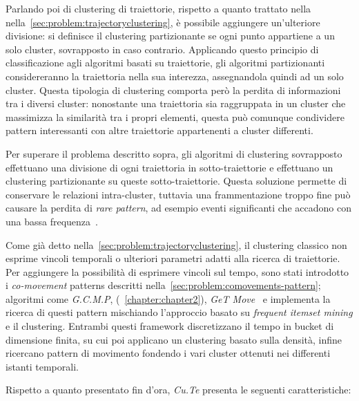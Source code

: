 Parlando poi di clustering di traiettorie, rispetto a quanto trattato nella nella~\cref{sec:problem:trajectoryclustering}, è possibile aggiungere un'ulteriore divisione:
si definisce il clustering partizionante se ogni punto appartiene a un solo cluster, sovrapposto in caso contrario.
Applicando questo principio di classificazione agli algoritmi basati su traiettorie, gli algoritmi partizionanti considereranno la traiettoria nella sua interezza,
assegnandola quindi ad un solo cluster. Questa tipologia di clustering comporta però la perdita di informazioni tra i diversi cluster:
nonostante una traiettoria sia raggruppata in un cluster che massimizza la similarità tra i propri elementi,
questa può comunque condividere pattern interessanti con altre traiettorie appartenenti a cluster differenti.

Per superare il problema descritto sopra, gli algoritmi di clustering sovrapposto effettuano una divisione di ogni traiettoria
in sotto-traiettorie e effettuano un clustering partizionante su queste sotto-traiettorie.
Questa soluzione permette di conservare le relazioni intra-cluster, tuttavia una frammentazione troppo fine può causare
la perdita di \textit{rare pattern}, ad esempio eventi significanti che accadono con una bassa frequenza~\cite{DBLP:journals/tkdd/KohR16, DBLP:journals/geoinformatica/HuangPX06}.

Come già detto nella~\cref{sec:problem:trajectoryclustering}, il clustering classico non esprime vincoli temporali o ulteriori parametri adatti alla ricerca di traiettorie.
Per aggiungere la possibilità di esprimere vincoli sul tempo, sono stati introdotto i \textit{co-movement} patterns descritti nella~\cref{sec:problem:comovements-pattern}; algoritmi come \textit{G.C.M.P},
(~\cref{chapter:chapter2}), \textit{GeT Move}~\cite{DBLP:journals/ijitdm/PhanPT16} e  implementa la ricerca di questi pattern mischiando l'approccio basato su \textit{frequent itemset mining} e il clustering.
Entrambi questi framework discretizzano il tempo in bucket di dimensione finita, su cui poi applicano un clustering basato sulla densità, infine
ricercano pattern di movimento fondendo i vari cluster ottenuti nei differenti istanti temporali.

Rispetto a quanto presentato fin d'ora, \textit{Cu.Te} presenta le seguenti caratteristiche:

